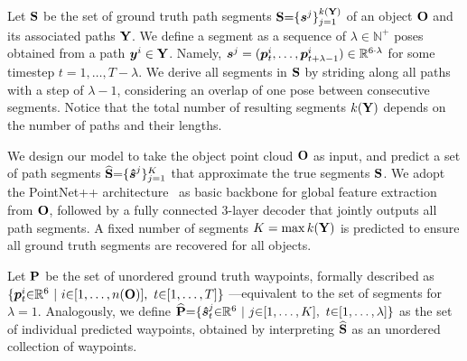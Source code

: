 Let $\mathbf{S}$ be the set of ground truth path segments $\mathbf{S} {=} \{\boldsymbol{s}^j\}_{j=1}^{k(\mathbf{Y})}$ of an object $\mathbf{O}$ and its associated paths $\mathbf{Y}$.
We define a segment as a sequence of $\lambda \in \mathbb{N}^+$ poses obtained from a path $\boldsymbol{y}^i \in \mathbf{Y}$.  
Namely, $\boldsymbol{s}^j = (\boldsymbol{p}^i_t, \dots, \boldsymbol{p}^i_{t+\lambda-1}) \in \mathbb{R}^{6 \cdot\lambda}$ for some timestep $t{=}1, \dots , T-\lambda$.
We derive all segments in \(\mathbf{S}\) by striding along all paths with a step of $\lambda-1$, \ie considering an overlap of one pose between consecutive segments.
Notice that the total number of resulting segments $k(\mathbf{Y})$ depends on the number of paths and their lengths.

%
We design our model to take the object point cloud $\mathbf{O}$ as input, and predict a set of path segments $\mathbf{\widehat{S}}{=}\{\boldsymbol{\hat{s}}^j\}_{j=1}^{K}$ that approximate the true segments $\mathbf{S}$. 
We adopt the PointNet++ architecture~\cite{Qi_Pointnet++_2017} as basic backbone for global feature extraction from $\mathbf{O}$, followed by a fully connected 3-layer decoder that jointly outputs all path segments. 
A fixed number of segments $K = \max k(\mathbf{Y})$ is predicted to ensure all ground truth segments are recovered for all objects.

Let $\mathbf{P}$ be the set of unordered ground truth waypoints, 
formally described as 
$\{\boldsymbol{p}^i_t {\in} \mathbb{R}^6 \ | \ i {\in} [1, \dots, n(\mathbf{O})], \ t{\in} [1, \dots, T] \}$
---equivalent to the set of segments for $\lambda{=}1$. Analogously, we define  
$\mathbf{\widehat{P}}{=}\{ \boldsymbol{\hat{s}}^j_t {\in} \mathbb{R}^6 \ | \ j {\in} [1, \dots, K], \ t {\in} [1, \dots, \lambda] \}$
as the set of individual predicted waypoints, obtained by interpreting $\mathbf{\widehat{S}}$ as an unordered collection of waypoints.

